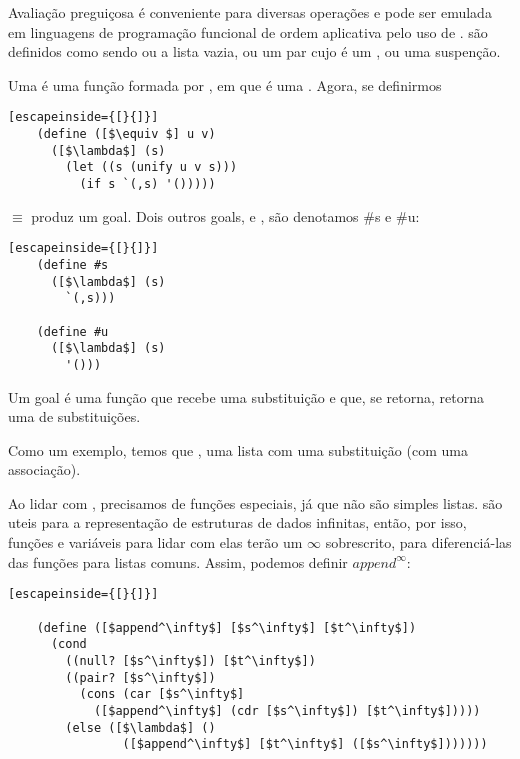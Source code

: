 \documentclass{article}
\begin{document}
  Avaliação preguiçosa é conveniente para diversas operações e pode
  ser emulada em linguagens de programação funcional de ordem
  aplicativa pelo uso de .  são
  definidos como sendo ou a lista vazia, ou um par cujo
   é um , ou uma suspenção.

  Uma  é uma função formada por , em que  é uma
  . Agora, se definirmos

  \begin{lstlisting}[escapeinside={[}{]}]
    (define ([$\equiv $] u v)
      ([$\lambda$] (s)
        (let ((s (unify u v s)))
          (if s `(,s) '()))))
  \end{lstlisting}
        
  \noindent $\equiv $ produz um goal. Dois outros goals, 
  e , são denotamos \#s e \#u:\\

  \begin{lstlisting}[escapeinside={[}{]}]
    (define #s
      ([$\lambda$] (s)
        `(,s)))

    (define #u
      ([$\lambda$] (s)
        '()))
  \end{lstlisting}

  Um goal é uma função que recebe uma substituição e que, se retorna,
  retorna uma  de substituições.

  Como um exemplo, temos que  \seta
  , uma lista com uma substituição (com uma
  associação).

  Ao lidar com , precisamos de funções especiais,
  já que não são simples listas.  são uteis para a
  representação de estruturas de dados infinitas, então, por isso,
  funções e variáveis para lidar com elas terão um $\infty$ sobrescrito,
  para diferenciá-las das funções para listas comuns. Assim, podemos
  definir $append^\infty$:

  \begin{lstlisting}[escapeinside={[}{]}]

    (define ([$append^\infty$] [$s^\infty$] [$t^\infty$])
      (cond
        ((null? [$s^\infty$]) [$t^\infty$])
        ((pair? [$s^\infty$])
          (cons (car [$s^\infty$]
            ([$append^\infty$] (cdr [$s^\infty$]) [$t^\infty$]))))
        (else ([$\lambda$] ()
                ([$append^\infty$] [$t^\infty$] ([$s^\infty$]))))))
        
  \end{lstlisting}
\end{document}
